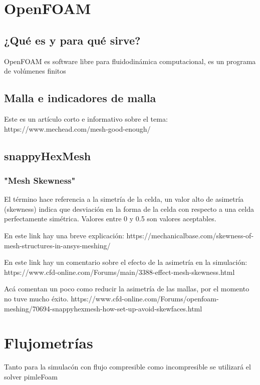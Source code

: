 %

\section{OpenFOAM}
\subsection{¿Qué es y para qué sirve?}
OpenFOAM\cite{openfoam} es software libre para fluidodinámica computacional,
es un programa de volúmenes finitos

\subsection{Malla e indicadores de malla}

Este es un artículo corto e informativo sobre el tema:
https://www.mechead.com/mesh-good-enough/


\subsection{snappyHexMesh}

\subsubsection{"Mesh Skewness"}
El término hace referencia a la simetría de la celda, un valor alto de
asimetría (skewness) indica que desviación en la forma de la celda con respecto
a una celda perfectamente simétrica. Valores entre 0 y 0.5 son valores
aceptables.

En este link hay una breve explicación:
https://mechanicalbase.com/skewness-of-mesh-structures-in-ansys-meshing/

En este link hay un comentario sobre el efecto de la asimetría en la simulación:
https://www.cfd-online.com/Forums/main/3388-effect-mesh-skewness.html

Acá comentan un poco como reducir la asimetría de las mallas, por el momento no
tuve mucho éxito.
https://www.cfd-online.com/Forums/openfoam-meshing/70694-snappyhexmesh-how-set-up-avoid-skewfaces.html

\section{Flujometrías}
Tanto para la simulacón con flujo compresible como incompresible se utilizará
el solver pimleFoam

